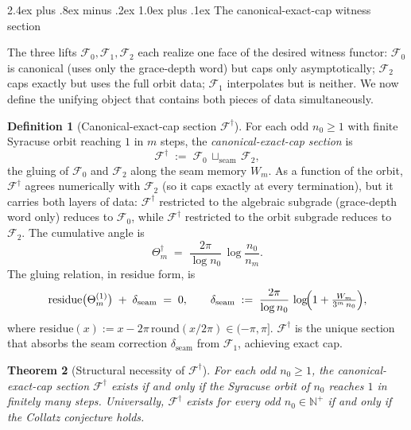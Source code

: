 \documentclass[11pt,a4paper]{article}
\makeatletter
\theoremstyle{plain}
\newtheorem{theorem}{Theorem}[section]
\theoremstyle{definition}
\newtheorem{definition}[theorem]{Definition}
\theoremstyle{remark}
\numberwithin{equation}{section}
\newcommand{\Nat}{\mathbb{N}}
\renewcommand{\subsection}{%
  \@startsection{subsection}{2}{0pt}%
    {2.4ex plus .8ex minus .2ex}%
    {1.0ex plus .1ex}%
    {\normalfont\Large\bfseries\color{headingAccent}}%
}
\makeatother
\begin{document}
\subsection{The canonical-exact-cap witness section}
\label{subsec:canonical-exact-cap}

The three lifts $\mathcal{F}_0,\mathcal{F}_1,\mathcal{F}_2$ each
realize one face of the desired witness functor: $\mathcal{F}_0$ is
canonical (uses only the grace-depth word) but caps only
asymptotically; $\mathcal{F}_2$ caps exactly but uses the full orbit
data; $\mathcal{F}_1$ interpolates but is neither.  We now define the
unifying object that contains both pieces of data simultaneously.

\begin{definition}[Canonical-exact-cap section $\mathcal{F}^{\dagger}$]
\label{def:canonical-exact-cap-section}
For each odd $n_0\ge 1$ with finite Syracuse orbit reaching $1$ in
$m$ steps, the \emph{canonical-exact-cap section} is
\[
  \mathcal{F}^{\dagger}\;:=\;\mathcal{F}_0\,\sqcup_{\mathrm{seam}}\,\mathcal{F}_2,
\]
the gluing of $\mathcal{F}_0$ and $\mathcal{F}_2$ along the seam
memory $W_m$.  As a function of the orbit, $\mathcal{F}^{\dagger}$
agrees numerically with $\mathcal{F}_2$ (so it caps exactly at every
termination), but it carries both layers of data:
$\mathcal{F}^{\dagger}$ restricted to the algebraic subgrade
(grace-depth word only) reduces to $\mathcal{F}_0$, while
$\mathcal{F}^{\dagger}$ restricted to the orbit subgrade reduces to
$\mathcal{F}_2$.  The cumulative angle is
\[
  \Theta_m^{\dagger}\;=\;\frac{2\pi}{\log n_0}\,\log\!\frac{n_0}{n_m}.
\]
The gluing relation, in residue form, is
\[
  \mathrm{residue}\bigl(\Theta_m^{(1)}\bigr)\;+\;\delta_{\mathrm{seam}}\;=\;0,
  \qquad
  \delta_{\mathrm{seam}}\;:=\;\frac{2\pi}{\log n_0}\,\log\!\Bigl(1+\tfrac{W_m}{3^m\,n_0}\Bigr),
\]
where $\mathrm{residue}(x):=x-2\pi\,\mathrm{round}(x/2\pi)\in(-\pi,\pi]$.
$\mathcal{F}^{\dagger}$ is the unique section that absorbs the seam
correction $\delta_{\mathrm{seam}}$ from $\mathcal{F}_1$, achieving
exact cap.
\end{definition}

\begin{theorem}[Structural necessity of $\mathcal{F}^{\dagger}$]
\label{thm:fdagger-existence}
For each odd $n_0\ge 1$, the canonical-exact-cap section
$\mathcal{F}^{\dagger}$ exists \emph{if and only if} the Syracuse
orbit of $n_0$ reaches $1$ in finitely many steps.  Universally,
$\mathcal{F}^{\dagger}$ exists for every odd $n_0\in\Nat^+$ if and
only if the Collatz conjecture holds.
\end{theorem}
\end{document}
